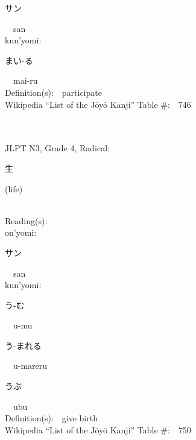 \begin{multicols}{2}
{\hspace*{2em}}{\begin{CJK}{UTF8}{min} サン \end{CJK}}\ \ san\ \ \\
{\hspace*{1em}}kun'yomi:\ \ \\
{\hspace*{2em}}{\begin{CJK}{UTF8}{min} まい-る \end{CJK}}\ \ mai-ru\ \ \\
Definition(s):\ \ participate \\
Wikipedia ``List of the J\=oy\=o Kanji'' Table \#:\ \ 746 \\
\ \ \\
{\fontsize{34pt}{40pt}  }\ \ \\  %
{JLPT N3, Grade 4, Radical:\ \ {\begin{CJK}{UTF8}{min} 生 \end{CJK}} (life) } \\
Reading(s):\ \ \\
{\hspace*{1em}}on'yomi:\ \ \\
{\hspace*{2em}}{\begin{CJK}{UTF8}{min} サン \end{CJK}}\ \ san\ \ \\
{\hspace*{1em}}kun'yomi:\ \ \\
{\hspace*{2em}}{\begin{CJK}{UTF8}{min} う-む \end{CJK}}\ \ u-mu\ \ \\
{\hspace*{2em}}{\begin{CJK}{UTF8}{min} う-まれる \end{CJK}}\ \ u-mareru\ \ \\
{\hspace*{2em}}{\begin{CJK}{UTF8}{min} うぶ \end{CJK}}\ \ ubu\ \ \\
Definition(s):\ \ give birth \\
Wikipedia ``List of the J\=oy\=o Kanji'' Table \#:\ \ 750 \\

\end{multicols}
